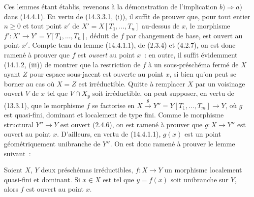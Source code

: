 Ces lemmes étant établis, revenons à la démonstration de l'implication $b)\Rightarrow
a)$ dans (14.4.1). En vertu de (14.3.3.1, (i)), il suffit de prouver que, pour tout
entier $n\geq 0$ et tout point $x'$ de $X'=X[T_1,\ldots,T_n]$ au-dessus de $x$, le
morphisme
$f':X'\to Y'=Y[T_1,\ldots,T_n]$, déduit de $f$ par changement de base, est ouvert
au point $x'$. Compte tenu du lemme (14.4.1.1), de (2.3.4) et (4.2.7), on est donc
ramené à prouver que $f$ est \emph{ouvert} au point $x$~: en outre, il suffit
évidemment (14.1.2, (iii)) de montrer que la restriction de $f$ à un
sous-préschéma fermé de $X$ ayant $Z$ pour espace sous-jacent est ouverte au point
$x$, si bien qu'on peut se borner au cas où $X=Z$ est irréductible. Quitte à
remplacer $X$ par un voisinage ouvert $V$ de $x$ tel que $V\cap X_y$ soit
irréductible, on peut supposer, en vertu de (13.3.1), que le morphisme $f$ se
factorise en
$X\xrightarrow{g}Y''=Y[T_1,\ldots,T_m]\to Y$,
où $g$ est quasi-fini, dominant et localement de type fini. Comme le morphisme
structural $Y''\to Y$ est ouvert (2.4.6), on est ramené à prouver que $g:X\to Y''$
est ouvert au point $x$. D'ailleurs, en vertu de (14.4.1.1), $g(x)$ est un point
géométriquement unibranche de $Y''$. On est donc ramené à prouver le lemme suivant~:

\begin{lemma}[14.4.1.3]
\label{IV.14.4.1.3-fr}
Soient $X$, $Y$ deux préschémas irréductibles, $f:X\to Y$ un morphisme localement
quasi-fini et dominant. Si $x\in X$ est tel que $y=f(x)$ soit unibranche sur $Y$,
alors $f$ est ouvert au point $x$.
\end{lemma}

